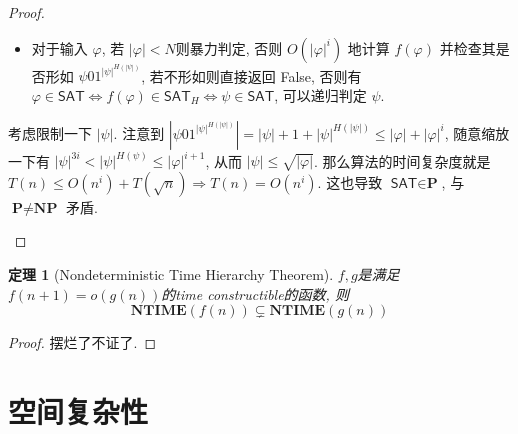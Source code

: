 \documentclass[8pt]{article}
\theoremstyle{compact}
\newtheorem{theorem}{定理}[section]
\def\le{\leqslant}
\def\NTIME{\textbf{NTIME}}
\def\P{\textbf{P}}
\def\NP{\textbf{NP}}
\def\coNP{\textbf{coNP}}
\begin{document}
\begin{proof}
\begin{itemize}
		\begin{itemize}
			\item 对于输入 $\varphi$, 若 $|\varphi| < N$则暴力判定, 否则 $O(|\varphi|^i)$ 地计算 $f(\varphi)$ 并检查其是否形如 $\psi01^{|\psi|^{H(|\psi|)}}$, 若不形如则直接返回 False, 否则有 $\varphi \in \textsf{SAT} \Leftrightarrow f(\varphi) \in \textsf{SAT}_H \Leftrightarrow \psi \in \textsf{SAT}$, 可以递归判定 $\psi$.
		\end{itemize}
		
		考虑限制一下 $|\psi|$. 注意到 $\left|\psi01^{|\psi|^{H(|\psi|)}}\right| = |\psi| + 1 + |\psi|^{H(|\psi|)} \le |\varphi| + |\varphi|^i$, 随意缩放一下有 $|\psi|^{3i} < |\psi|^{H(\psi)} \le |\varphi|^{i+1}$, 从而 $|\psi| \le \sqrt{|\varphi|}$. 那么算法的时间复杂度就是 $T(n) \le O(n^i) + T(\sqrt n) \Rightarrow T(n) = O(n^i)$. 这也导致 $\textsf{SAT} \in \P$, 与 $\P \neq \NP$ 矛盾.
	\end{itemize}
\end{proof}
\begin{theorem}[Nondeterministic Time Hierarchy Theorem]
	$f, g$是满足$f(n + 1) = o(g(n))$的time constructible的函数, 则
	$$\NTIME(f(n)) \subsetneq \NTIME(g(n))$$
\end{theorem}
\begin{proof}
	摆烂了不证了.

\end{proof}

\newpage
\section{空间复杂性}
\end{document}
